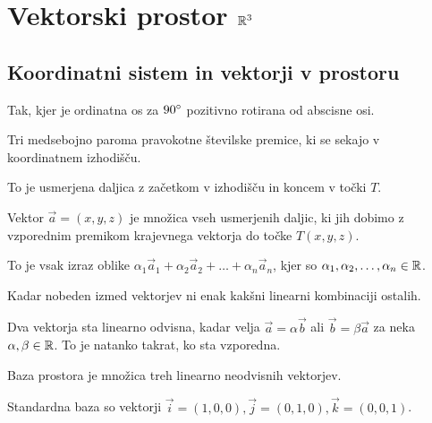 \section{Vektorski prostor $\mathbb{R}^3$}

\subsection{Koordinatni sistem in vektorji v prostoru}


Tak, kjer je ordinatna os za $90\degree$ pozitivno rotirana od abscisne osi.


Tri medsebojno paroma pravokotne številske premice, ki se sekajo v koordinatnem izhodišču.


To je usmerjena daljica z začetkom v izhodišču in koncem v točki $T$.


Vektor $\vec{a} = (x, y, z)$ je množica vseh usmerjenih daljic, ki jih dobimo z vzporednim premikom krajevnega vektorja do točke $T(x, y, z)$.


To je vsak izraz oblike $\alpha_1 \vec{a}_1 + \alpha_2 \vec{a}_2 + \ldots + \alpha_n \vec{a}_n$, kjer so $\alpha_1, \alpha_2, \ldots, \alpha_n \in \mathbb{R}$.


Kadar nobeden izmed vektorjev ni enak kakšni linearni kombinaciji ostalih.

Dva vektorja sta linearno odvisna, kadar velja $\vec{a} = \alpha \vec{b}$ ali $\vec{b} = \beta \vec{a}$ za neka $\alpha, \beta \in \mathbb{R}$. To je natanko takrat, ko sta vzporedna.


Baza prostora je množica treh linearno neodvisnih vektorjev.

Standardna baza so vektorji $\vec{i} = (1, 0, 0), \vec{j} = (0, 1, 0), \vec{k} = (0, 0, 1)$.

